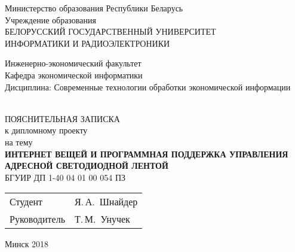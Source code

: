 \begin{titlepage}
  \begin{center}
    Министерство образования Республики Беларусь\\[1em]
    Учреждение образования\\
    БЕЛОРУССКИЙ ГОСУДАРСТВЕННЫЙ УНИВЕРСИТЕТ \\
    ИНФОРМАТИКИ И РАДИОЭЛЕКТРОНИКИ\\[1em]

    \begin{minipage}{\textwidth}
      \begin{flushleft}
          Инженерно-экономический факультет\\
          Кафедра экономической информатики\\
          Дисциплина: Современные технологии обработки экономической информации
      \end{flushleft}
    \end{minipage}\\[3em]

    {ПОЯСНИТЕЛЬНАЯ ЗАПИСКА}\\
    {к дипломному проекту}\\
    {на тему}\\[3em]
    \textbf{\large\MakeUppercase{Интернет вещей и программная поддержка управления адресной светодиодной лентой}}\\[1em]


    {БГУИР ДП  1-40 04 01 00 054 ПЗ}\\[2em]
    
    \begin{tabular}{ p{}p{} }
      Студент & Я.\,А.~Шнайдер \\
      Руководитель & Т.\,М.~Унучек
    \end{tabular}
    
    \vfill
    {\normalsize Минск 2018}
  \end{center}
\end{titlepage}
